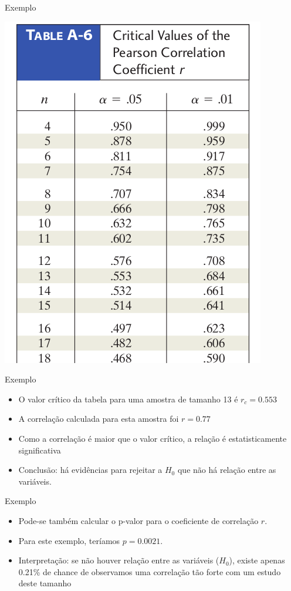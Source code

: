 \documentclass{beamer}
\begin{document}
\begin{frame}{Exemplo}
  \begin{center}
      \includegraphics[height=0.8\textheight]{Assoc/test}
  \end{center}
\end{frame}

\begin{frame}{Exemplo}
  \begin{itemize}
  \item O valor crítico da tabela para uma amostra de tamanho 13 é
    $r_c = 0.553$
  \item A correlação calculada para esta amostra foi $r=0.77$
  \item Como a correlação é maior que o valor crítico, a relação é
    estatisticamente significativa
  \item Conclusão: há evidências para rejeitar a $H_0$ que não há
    relação entre as variáveis.
  \end{itemize}
\end{frame}

\begin{frame}{Exemplo}
  \begin{itemize}
  \item Pode-se também calcular o p-valor para o coeficiente de
    correlação $r$.
  \item Para este exemplo, teríamos $p=0.0021$.
  \item Interpretação: se não houver relação entre as variáveis
    ($H_0$), existe apenas 0.21\% de chance de observamos uma
    correlação tão forte com um estudo deste tamanho
  \end{itemize}
\end{frame}
\end{document}
